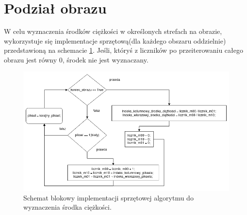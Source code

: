 \section{Podział obrazu}

W celu wyznaczenia środków ciężkości w określonych strefach na obrazie, wykorzystuje się implementacje sprzętową(dla każdego obszaru oddzielnie) przedstawioną na schemacie \ref{fig:wyzn_sc}. Jeśli, któryś z liczników po przeiterowaniu całego obrazu jest równy 0, środek nie jest wyznaczany.
\begin{figure}
	\centering
	\includegraphics[scale=0.6]{wyzn_sc.png}
	\caption{Schemat blokowy implementacji sprzętowej algorytmu do wyznaczenia środka ciężkości.}
	\label{fig:wyzn_sc}
\end{figure}